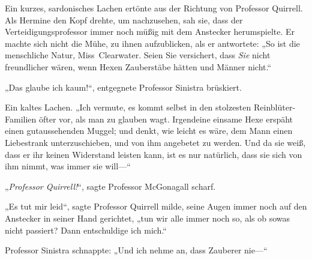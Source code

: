Ein kurzes, sardonisches Lachen ertönte aus der Richtung von Professor Quirrell. Als Hermine den Kopf drehte, um nachzusehen, sah sie, dass der Verteidigungsprofessor immer noch müßig mit dem Anstecker herumspielte. Er machte sich nicht die Mühe, zu ihnen aufzublicken, als er antwortete:
„So ist die menschliche Natur, Miss~Clearwater. Seien Sie versichert, dass \emph{Sie} nicht freundlicher wären, wenn Hexen Zauberstäbe hätten und Männer nicht.“

„Das glaube ich kaum!“, entgegnete Professor Sinistra brüskiert.

Ein kaltes Lachen.
„Ich vermute, es kommt selbst in den stolzesten Reinblüter-Familien öfter vor, als man zu glauben wagt. Irgendeine einsame Hexe erspäht einen gutaussehenden Muggel; und denkt, wie leicht es wäre, dem Mann einen Liebestrank unterzuschieben, und von ihm angebetet zu werden. Und da sie weiß, dass er ihr keinen Widerstand leisten kann, ist es nur natürlich, dass sie sich von ihm nimmt, was immer sie will—“

„\emph{Professor Quirrell!}“, sagte Professor McGonagall scharf.

„Es tut mir leid“, sagte Professor Quirrell milde, seine Augen immer noch auf den Anstecker in seiner Hand gerichtet, „tun wir alle immer noch so, als ob sowas nicht passiert? Dann entschuldige ich mich.“

Professor Sinistra schnappte:
„Und ich nehme an, dass Zauberer nie—“

